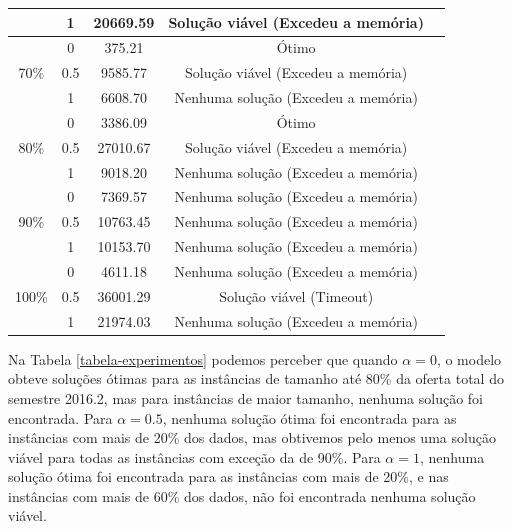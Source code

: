 \begin{table}[h!]
{\begin{tabular}{ccccc}
			                      &   1 & 20669.59 & Solução viável (Excedeu a memória)\\
			\midrule
			\multirow{3}{*}{70\%} &   0 &   375.21 & Ótimo \\
			                      & 0.5 &  9585.77 & Solução viável (Excedeu a memória)\\
			                      &   1 &  6608.70 & Nenhuma solução (Excedeu a memória) \\
			\midrule
			\multirow{3}{*}{80\%} &   0 &  3386.09 & Ótimo \\
			                      & 0.5 & 27010.67 & Solução viável (Excedeu a memória)\\
			                      &   1 &  9018.20 & Nenhuma solução (Excedeu a memória)\\
			\midrule
			\multirow{3}{*}{90\%} &   0 &  7369.57 & Nenhuma solução (Excedeu a memória)\\
			                      & 0.5 & 10763.45 & Nenhuma solução (Excedeu a memória)\\
			                      &   1 & 10153.70 & Nenhuma solução (Excedeu a memória)\\
			\midrule
			\multirow{3}{*}{100\%}&   0 &  4611.18 & Nenhuma solução (Excedeu a memória)\\
			                      & 0.5 & 36001.29 & Solução viável (Timeout) \\
			                      &   1 & 21974.03 & Nenhuma solução (Excedeu a memória)\\
			\bottomrule
		\end{tabular}%
	}{
	}
\end{table}

\newpage

Na Tabela \ref{tabela-experimentos} podemos perceber que quando $\alpha = 0$, o modelo obteve soluções ótimas para as instâncias de tamanho até 80\% da oferta total do semestre 2016.2, mas para instâncias de maior tamanho, nenhuma solução foi encontrada. Para $\alpha = 0.5$, nenhuma solução ótima foi encontrada para as instâncias com mais de 20\% dos dados, mas obtivemos pelo menos uma solução viável para todas as instâncias com exceção da de 90\%. Para $\alpha = 1$, nenhuma solução ótima foi encontrada para as instâncias com mais de 20\%, e nas instâncias com mais de 60\% dos dados, não foi encontrada nenhuma solução viável.

